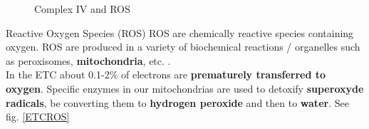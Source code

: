 \documentclass[../main.tex]{subfiles}
\begin{document}
\begin{figure}[H]
	\centering
	\caption{Complex IV and ROS}
\end{figure}


\begin{RemarkWithTitel}{Reactive Oxygen Species (ROS)}
	ROS are chemically reactive species containing oxygen. ROS are produced in a variety of biochemical reactions / organelles such as peroxisomes, \textbf{mitochondria}, etc. . \\
	In the ETC about 0.1-2\% of electrons are \textbf{prematurely transferred to oxygen}. Specific enzymes in our mitochondrias are used to detoxify \textbf{superoxyde radicals}, be converting them to \textbf{hydrogen peroxide} and then to \textbf{water}. See fig. \ref{ETCROS} 
\end{RemarkWithTitel}
\end{document}
